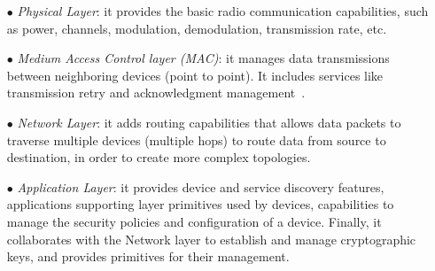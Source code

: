 \documentclass[12pt]{report}
\begin{document}
{{\begin{itemize}
\setlength{\itemindent}{+4mm}
\item[$\bullet$] \emph{Physical Layer}: it provides the basic radio communication capabilities, such as power, channels, modulation, demodulation, transmission rate, etc.
\item[$\bullet$] \emph{Medium Access Control layer (MAC)}: it manages data transmissions between neighboring devices (point to point). 
It includes services like transmission retry and acknowledgment management~\cite{digi}.
\item[$\bullet$] \emph{Network Layer}: it adds routing capabilities that allows data packets to traverse multiple devices (multiple hops) to route data from source to destination, in order to create more complex topologies.
\item[$\bullet$] \emph{Application Layer}: it provides device and service discovery features, applications supporting layer primitives used by devices, capabilities to manage the security policies and configuration of a device. Finally, it collaborates with the Network layer to establish and manage cryptographic keys, and provides primitives for their management.

\end{itemize}

}}
\end{document}
